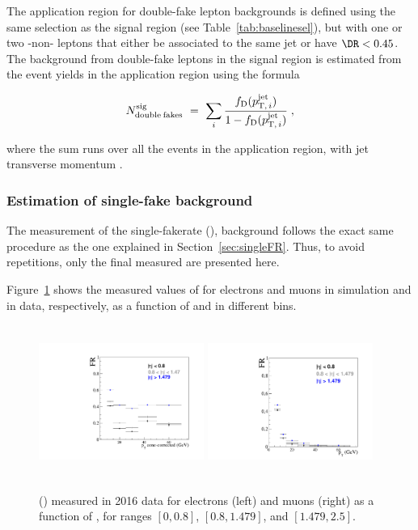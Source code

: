 The application region for double-fake lepton backgrounds 
is defined using the same selection as the signal region (see
Table~\ref{tab:baselinesel}), but with one or two \fo -non-\tD
leptons that either be associated to the same jet or have $\DR<0.45$. 
The background from double-fake leptons in the signal region is
estimated from the event yields in the application region using
the formula
\begin{linenomath}
  \begin{equation}
    \label{eq:dFRbkg}
    N_{\mathrm{double\: fakes}}^{\mathrm{sig}} ~=~ 
    \sum_i\frac{f_{\mathrm{D}}(p_{\mathrm{T,\,}i}^{\mathrm{jet}})}{1-f_{\mathrm{D}}(p_{\mathrm{T,\,}i}^{\mathrm{jet}})}\;,
  \end{equation}
\end{linenomath}
where the sum runs over all the events in the application region, with jet transverse momentum .
\subsubsection{Estimation of single-fake background}
\label{sec:singleFakeBkg}

The measurement of the single-fakerate (\fr), \sfr background follows the exact same
procedure as the one explained in Section~\ref{sec:singleFR}. Thus, to
avoid repetitions, only the final measured \fr are presented here.

Figure~\ref{fig:sfr_data} shows the measured
values of \sfr for electrons and muons in simulation and in data,
respectively, as a function of \ptc and in different \abseta bins.
\begin{figure}[h!]
  \centering
  \includegraphics[height=5cm, width=5.4cm]{Figures/c6/backgrounds/FR/sFR/data/electrons.pdf}
  \includegraphics[height=5cm, width=5.4cm]{Figures/c6/backgrounds/FR/sFR/data/muons.pdf}\\
  \caption{\fr (\sfr) measured in 2016 data for electrons (left) and
    muons (right) as a function of \ptc, for \abseta ranges $[0,0.8]$, $[0.8,1.479]$, and $[1.479,2.5]$.}
  \label{fig:sfr_data}
\end{figure}

